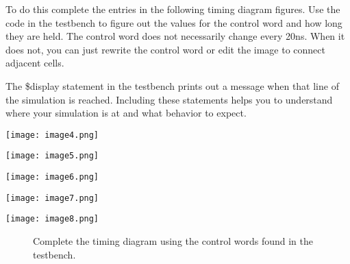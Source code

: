 To do this complete the entries in the following timing diagram figures.
Use the code in the testbench to figure out the values for the control
word and how long they are held. The control word does not necessarily
change every 20ns. When it does not, you can just rewrite the control
word or edit the image to connect adjacent cells.

The \$display statement in the testbench prints out a message when that
line of the simulation is reached. Including these statements helps you
to understand where your simulation is at and what behavior to expect.

\begin{landscape}
\texttt{[image:  image4.png]}

\texttt{[image:  image5.png]}

\texttt{[image:  image6.png]}

\texttt{[image:  image7.png]}

\texttt{[image:  image8.png]}

\begin{figure}[ht]
\caption{Complete the timing diagram using the control words found in the testbench.}
\label{figure:swDPtiming}
\end{figure}

\end{landscape}

